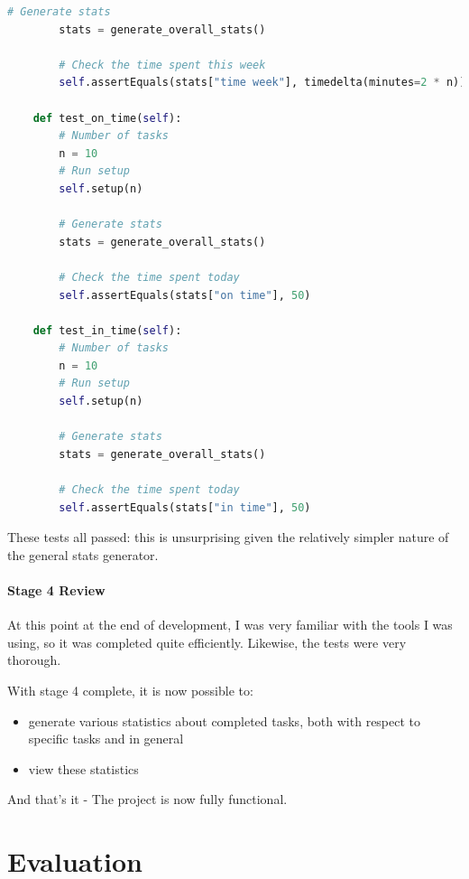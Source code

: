 \documentclass{article}
\begin{document}
\begin{lstlisting}[language=Python]
        # Generate stats
        stats = generate_overall_stats()

        # Check the time spent this week
        self.assertEquals(stats["time week"], timedelta(minutes=2 * n))

    def test_on_time(self):
        # Number of tasks
        n = 10
        # Run setup
        self.setup(n)

        # Generate stats
        stats = generate_overall_stats()

        # Check the time spent today
        self.assertEquals(stats["on time"], 50)

    def test_in_time(self):
        # Number of tasks
        n = 10
        # Run setup
        self.setup(n)

        # Generate stats
        stats = generate_overall_stats()

        # Check the time spent today
        self.assertEquals(stats["in time"], 50)
\end{lstlisting}

These tests all passed:
this is unsurprising given the relatively simpler nature of the general stats generator.

\subsection{Stage 4 Review}
At this point at the end of development,
I was very familiar with the tools I was using,
so it was completed quite efficiently.
Likewise,
the tests were very thorough.

With stage 4 complete, it is now possible to:
\begin{itemize}
	\item generate various statistics about completed tasks,
	      both with respect to specific tasks and in general
	\item view these statistics
\end{itemize}

And that's it -
The project is now fully functional.

\part{Evaluation}
\end{document}
